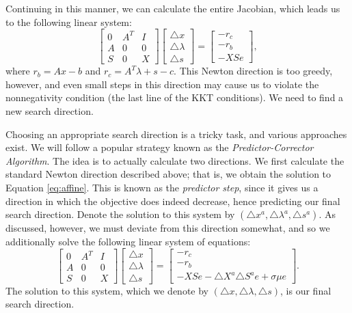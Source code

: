 Continuing in this manner, we can calculate the entire Jacobian, which leads us to the following linear system:
\begin{equation}
\begin{bmatrix}
0 & A^T & I\\
A & 0 & 0\\
S & 0 & X
\end{bmatrix}
\begin{bmatrix}
\triangle x\\
\triangle \lambda\\
\triangle s
\end{bmatrix}
=
\begin{bmatrix}
-r_c\\
-r_b\\
-XSe
\end{bmatrix},
\label{eq:affine}
\end{equation}
where $r_b = Ax - b$ and $r_c = A^T\lambda + s - c$.
This Newton direction is too greedy, however, and even small steps in this direction may cause us to violate the nonnegativity
condition (the last line of the KKT conditions). We need to find a new search direction.

Choosing an appropriate search direction is a tricky task, and various approaches exist. We will follow a popular strategy
known as the \emph{Predictor-Corrector Algorithm}. The idea is to actually calculate two directions. We first calculate
the standard Newton direction described above; that is, we obtain the solution to Equation \ref{eq:affine}. This is known as
the \emph{predictor step}, since it gives us a direction in which the objective does indeed decrease, hence predicting our
final search direction. Denote the solution to this system by $(\triangle x^a, \triangle \lambda^a, \triangle s^a)$.
As discussed, however, we must deviate from this direction somewhat, and so we additionally solve the
following linear system of equations:
\begin{equation}
\begin{bmatrix}
0 & A^T & I\\
A & 0 & 0\\
S & 0 & X
\end{bmatrix}
\begin{bmatrix}
\triangle x\\
\triangle \lambda\\
\triangle s
\end{bmatrix}
=
\begin{bmatrix}
-r_c\\
-r_b\\
-XSe - \triangle X^a\triangle S^ae + \sigma \mu e
\end{bmatrix}.
\label{eq:centering}
\end{equation}
The solution to this system, which we denote by $(\triangle x, \triangle \lambda, \triangle s)$, is our final search direction.

